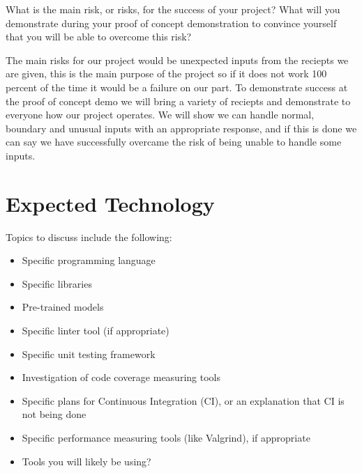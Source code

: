 \documentclass{article}
\begin{document}
What is the main risk, or risks, for the success of your project?  What will you
demonstrate during your proof of concept demonstration to convince yourself that
you will be able to overcome this risk?

\vspace{0.5cm}

The main risks for our project would be unexpected inputs from the reciepts we are 
given, this is the main purpose of the project so if it does not work 100 percent of the 
time it would be a failure on our part. To demonstrate success at the proof of concept
demo we will bring a variety of reciepts and demonstrate to everyone how our project operates.
We will show we can handle normal, boundary and unusual inputs with an appropriate response, and if 
this is done we can say we have successfully overcame the risk of being unable to handle some inputs. 

\section{Expected Technology}



Topics to discuss include the following:

\begin{itemize}
\item Specific programming language
\item Specific libraries
\item Pre-trained models
\item Specific linter tool (if appropriate)
\item Specific unit testing framework
\item Investigation of code coverage measuring tools
\item Specific plans for Continuous Integration (CI), or an explanation that CI
  is not being done
\item Specific performance measuring tools (like Valgrind), if
  appropriate
\item Tools you will likely be using?
\end{itemize}
\end{document}
